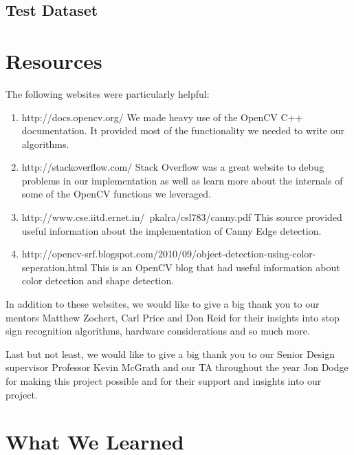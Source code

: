 \documentclass[letterpaper,10pt,titlepage]{article}
\begin{document}
\subsection*{Test Dataset}

\section*{Resources}
The following websites were particularly helpful:

\begin{enumerate}
    \item http://docs.opencv.org/
    We made heavy use of the OpenCV C++ documentation. It provided most of the
    functionality we needed to write our algorithms.
    \item http://stackoverflow.com/
    Stack Overflow was a great website to debug problems in our implementation
    as well as learn more about the internals of some of the OpenCV functions
    we leveraged.
    \item http://www.cse.iitd.ernet.in/~pkalra/csl783/canny.pdf
    This source provided useful information about the implementation of Canny
    Edge detection.
    \item http://opencv-srf.blogspot.com/2010/09/object-detection-using-color-seperation.html
    This is an OpenCV blog that had useful information about color detection
    and shape detection.
\end{enumerate}

In addition to these websites, we would like to give a big thank you to our 
mentors Matthew Zochert, Carl Price and Don Reid for their insights into 
stop sign recognition algorithms, hardware considerations and so much more. 

Last but not least, we would like to give a big thank you to our Senior Design
supervisor Professor Kevin McGrath and our TA throughout the year Jon Dodge for
making this project possible and for their support and insights into our 
project. 

\section*{What We Learned}
\end{document}

